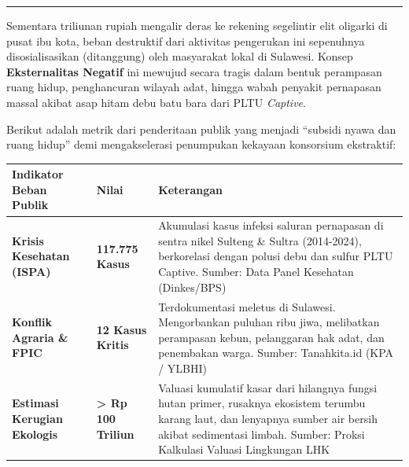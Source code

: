 \documentclass[
]{article}
\newcounter{none} %
\begin{document}
\begin{center}\rule{0.5\linewidth}{0.5pt}\end{center}

Sementara triliunan rupiah mengalir deras ke rekening segelintir elit
oligarki di pusat ibu kota, beban destruktif dari aktivitas pengerukan
ini sepenuhnya disosialisasikan (ditanggung) oleh masyarakat lokal di
Sulawesi. Konsep \textbf{Eksternalitas Negatif} ini mewujud secara
tragis dalam bentuk perampasan ruang hidup, penghancuran wilayah adat,
hingga wabah penyakit pernapasan massal akibat asap hitam debu batu bara
dari PLTU \emph{Captive}.

Berikut adalah metrik dari penderitaan publik yang menjadi ``subsidi
nyawa dan ruang hidup'' demi mengakselerasi penumpukan kekayaan
konsorsium ekstraktif:

{\def\LTcaptype{none} %
\begin{longtable}[]{@{}
  >{\raggedright\arraybackslash}p{}
  >{\raggedright\arraybackslash}p{}
  >{\raggedright\arraybackslash}p{}@{}}
\toprule\noalign{}
\begin{minipage}[b]{\linewidth}\raggedright
Indikator Beban Publik
\end{minipage} & \begin{minipage}[b]{\linewidth}\raggedright
Nilai
\end{minipage} & \begin{minipage}[b]{\linewidth}\raggedright
Keterangan
\end{minipage} \\
\midrule\noalign{}
\endhead
\bottomrule\noalign{}
\endlastfoot
\textbf{Krisis Kesehatan (ISPA)} & \textbf{117.775 Kasus} & Akumulasi
kasus infeksi saluran pernapasan di sentra nikel Sulteng \& Sultra
(2014-2024), berkorelasi dengan polusi debu dan sulfur PLTU Captive.
Sumber: Data Panel Kesehatan (Dinkes/BPS) \\
\textbf{Konflik Agraria \& FPIC} & \textbf{12 Kasus Kritis} &
Terdokumentasi meletus di Sulawesi. Mengorbankan puluhan ribu jiwa,
melibatkan perampasan kebun, pelanggaran hak adat, dan penembakan warga.
Sumber: Tanahkita.id (KPA / YLBHI) \\
\textbf{Estimasi Kerugian Ekologis} & \textbf{\textgreater{} Rp 100
Triliun} & Valuasi kumulatif kasar dari hilangnya fungsi hutan primer,
rusaknya ekosistem terumbu karang laut, dan lenyapnya sumber air bersih
akibat sedimentasi limbah. Sumber: Proksi Kalkulasi Valuasi Lingkungan
LHK \\
\end{longtable}
}
\end{document}
